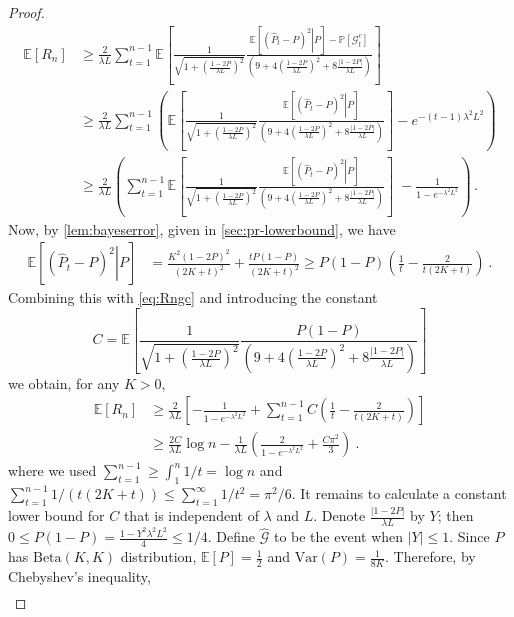 \documentclass[english]{article}
\newcommand{\cG}{\mathcal{G}}
\newcommand{\hP}{\hat{P}}
\newcommand{\Exp}[1]{\mathbb{E}\left[ #1 \right]}
\newcommand{\Expc}[2]{\mathbb{E}\left[ \left. #1 \right| #2 \right]}
\newcommand{\Prob}[1]{\mathbb{P}\left[#1\right]}
\begin{document}
\begin{proof}
\begin{align}
	\Exp{R_n} & \ge 
	\frac{2}{\lambda L}\sum_{t=1}^{n-1} \Exp{\frac{1}{\sqrt{1+\left( \frac{1-2P}{\lambda L}\right)^2 }}\frac{\Expc{ ( \hP_{t} - P )^2 }{P}-\Prob{\cG^c_t}}{ \left(9+ 4\left( \frac{1-2P}{\lambda L}\right)^2 +8 \frac{|1-2P|}{\lambda L} \right)}  } \nonumber \\
	& \ge \frac{2}{\lambda L}\sum_{t=1}^{n-1} \left( \Exp{\frac{1}{\sqrt{1+\left( \frac{1-2P}{\lambda L}\right)^2 }}\frac{\Expc{ ( \hP_{t} - P )^2 }{P}}{ \left(9+ 4\left( \frac{1-2P}{\lambda L}\right)^2 +8 \frac{|1-2P|}{\lambda L} \right)}  } - e^{-(t-1)\lambda^2L^2} \right) \nonumber \\
	& \ge \frac{2}{\lambda L}\left(\sum_{t=1}^{n-1} \Exp{\frac{1}{\sqrt{1+\left( \frac{1-2P}{\lambda L}\right)^2 }}\frac{\Expc{ ( \hP_{t} - P )^2 }{P}}{ \left(9+ 4\left( \frac{1-2P}{\lambda L}\right)^2 +8 \frac{|1-2P|}{\lambda L} \right)}  }  \; -  \frac{1}{1-e^{-\lambda^2L^2}} \right)\,. \label{eq:Rngc}
	\end{align} 
	Now, by \cref{lem:bayeserror}, given in \cref{sec:pr-lowerbound}, we have
	\begin{align*}
	\Expc{ ( \hP_{t} - P )^2 }{P} & = \frac{K^2(1-2P)^2}{(2K+t)^2} + \frac{tP(1-P)}{(2K+t)^2} \ge P(1-P) \left( \frac{1}{t} - \frac{2}{t(2K+t)} \right)~. 
	\end{align*}
	Combining this with \eqref{eq:Rngc} and introducing the constant
	\[
	C = \Exp{\frac{1}{\sqrt{1+\left( \frac{1-2P}{\lambda L}\right)^2 }}\frac{P(1-P)}{ \left(9+ 4\left( \frac{1-2P}{\lambda L}\right)^2 +8 \frac{|1-2P|}{\lambda L} \right)}  } 
	\]
	we obtain, for any $K>0$,
	\begin{align}
	\Exp{R_n}& \ge \frac{2}{\lambda L}\left[ - \frac{1}{1-e^{-\lambda^2L^2}} + \sum_{t=1}^{n-1} C\left(\frac{1}{t} - \frac{2}{t(2K+t)} \right) \right] \\
	 & \ge  \frac{2 C}{\lambda L} \log n - \frac{1}{\lambda L} \left(\frac{2}{1-e^{-\lambda^2L^2}} + \frac{C \pi^2}{3}\right)~.
	\end{align}
	where we used $\sum_{t=1}^{n-1} \ge \int_1^n 1/t = \log n$ and $\sum_{t=1}^{n-1} 1/(t(2K+t)) \le \sum_{t=1}^\infty 1/t^2 = \pi^2/6$.
	It remains to calculate a constant lower bound for $C$ that is independent of $\lambda$ and $L$. Denote $\frac{|1-2P|}{\lambda L}$ by $Y$; then $0\le P(1-P) = \frac{1-Y^2\lambda^2L^2}{4}\le 1/4$. Define $\widehat{\cG}$ to be the event when 
	$|Y| \le 1$. Since $P$ has $\mbox{Beta}(K,K)$ distribution, $\Exp{P} = \frac{1}{2}$ and $\mbox{Var}(P) = \frac{1}{8K}$. Therefore, by Chebyshev's inequality,
	\begin{align*}

\end{align*}
\end{proof}
\end{document}
